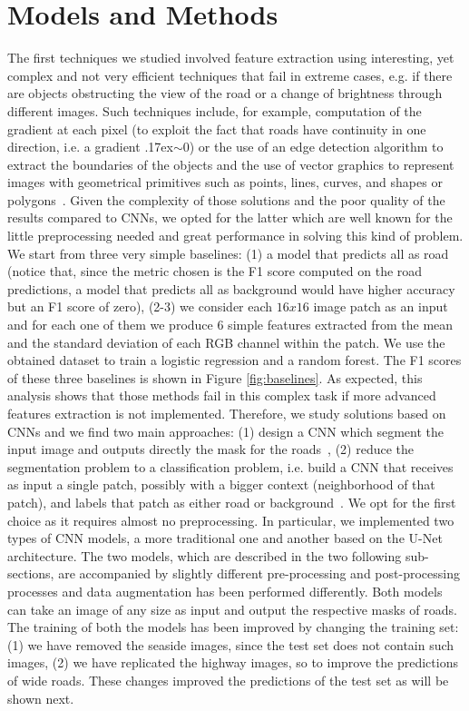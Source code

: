 \documentclass[10pt,conference,compsocconf]{IEEEtran}
\begin{document}
\section{Models and Methods}
\label{sec:models-methods}
The first techniques we studied involved feature extraction using interesting, yet complex and not very efficient techniques that fail in extreme cases, e.g. if there are objects obstructing the view of the road or a change of brightness through different images. Such techniques include, for example, computation of the gradient at each pixel (to exploit the fact that roads have continuity in one direction, i.e. a gradient {\raise.17ex\hbox{$\scriptstyle\sim$}}0) or the use of an edge detection algorithm to extract the boundaries of the objects and the use of vector graphics to represent images with geometrical primitives such as points, lines, curves, and shapes or polygons~\cite{HORMESE20161460}. Given the complexity of those solutions and the poor quality of the results compared to CNNs, we opted for the latter which are well known for the little preprocessing needed and great performance in solving this kind of problem.
We start from three very simple baselines: (1) a model that predicts all as road (notice that, since the metric chosen is the F1 score computed on the road predictions, a model that predicts all as background would have higher accuracy but an F1 score of zero), (2-3) we consider each $16x16$ image patch as an input and for each one of them we produce 6 simple features extracted from the mean and the standard deviation of each RGB channel within the patch. We use the obtained dataset to train a logistic regression and a random forest. The F1 scores of these three baselines is shown in Figure \ref{fig:baselines}. As expected, this analysis shows that those methods fail in this complex task if more advanced features extraction is not implemented.
Therefore, we study solutions based on CNNs and we find two main approaches: (1) design a CNN which segment the input image and outputs directly the mask for the roads~\cite{lis2016}, (2) reduce the segmentation problem to a classification problem, i.e. build a CNN that receives as input a single patch, possibly with a bigger context (neighborhood of that patch), and labels that patch as either road or background~\cite{dario2016}. We opt for the first choice as it requires almost no preprocessing. In particular, we implemented two types of CNN models, a more traditional one and another based on the U-Net architecture. The two models, which are described in the two following sub-sections, are accompanied by slightly different pre-processing and post-processing processes and data augmentation has been performed differently. Both models can take an image of any size as input and output the respective masks of roads. The training of both the models has been improved by changing the training set: (1) we have removed the seaside images, since the test set does not contain such images, (2) we have replicated the highway images, so to improve the predictions of wide roads. These changes improved the predictions of the test set as will be shown next.
\end{document}
